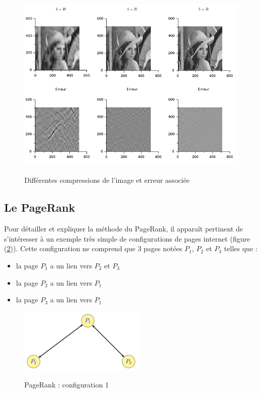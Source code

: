 \documentclass[a4paper,10pt]{report}
\begin{document}
\begin{figure}[H]
\centering
\caption{Différentes compressions de l'image et erreur associée}
\includegraphics[width=\textwidth]{lena_pg1.png}
\label{compression}
\end{figure}

\newpage
\subsection{Le PageRank}
Pour détailler et expliquer la méthode du PageRank, il apparaît pertinent de s'intéresser à un exemple très simple de configurations de pages internet (figure (\ref{config1})). Cette configuration ne comprend que 3 pages notées $P_1$, $P_2$ et $P_3$ telles que :\\
\begin{minipage}[c]{.40\linewidth}
\begin{itemize}
\item la page $P_1$ a un lien vers $P_2$ et $P_3$
\item la page $P_2$ a un lien vers $P_1$
\item la page $P_3$ a un lien vers $P_1$
\end{itemize}
\end{minipage} \hfill
\begin{minipage}[c]{.58\linewidth}
\begin{figure}[H]
\centering
\caption{PageRank : configuration 1}
\includegraphics[width=6cm]{config1.png}
\label{config1}
\end{figure}
\end{minipage}\\
\end{document}
